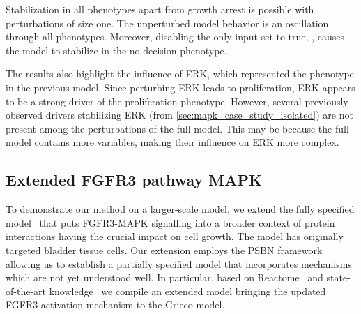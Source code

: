 Stabilization in all phenotypes apart from growth arrest is possible with perturbations of size one. The unperturbed model behavior is an oscillation through all phenotypes. Moreover, disabling the only input set to true, , causes the model to stabilize in the no-decision phenotype.

The results also highlight the influence of ERK, which represented the phenotype in the previous model. Since perturbing ERK leads to proliferation, ERK appears to be a strong driver of the proliferation phenotype. However, several previously observed drivers stabilizing ERK (from \autoref{sec:mapk_case_study_isolated}) are not present among the perturbations of the full model. This may be because the full model contains more variables, making their influence on ERK more complex.


\subsection{Extended FGFR3 pathway MAPK}

To demonstrate our method on a larger-scale model, we extend the fully specified model~\cite{Grieco2013} that puts FGFR3-MAPK signalling into a broader context of protein interactions having the crucial impact on cell growth. The model has originally targeted bladder tissue cells. Our extension employs the PSBN framework allowing us to establish a partially specified model that incorporates mechanisms which are not yet understood well. In particular, based on Reactome~\cite{Milacic2023} and state-of-the-art knowledge~\cite{Fafilek2018,Fafilek2022} we compile an extended model bringing the updated FGFR3 activation mechanism to the Grieco model. 


